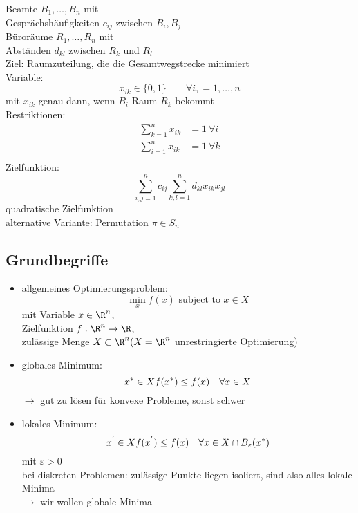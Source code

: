\begin{beispiel}\enter
	Beamte $B_{1},\dots,B_{n}$ mit \\
	Gesprächshäufigkeiten $c_{ij}$ zwischen $B_{i},B_{j}$ \\
	Büroräume $R_{1}, \dots, R_{n}$ mit \\
	Abständen $d_{kl}$ zwischen $R_{k}$ und $R_{l}$ \\
	Ziel: Raumzuteilung, die die Gesamtwegstrecke minimiert\\
	Variable:
	\begin{equation*}
		x_{ik} \in \{0,1\}\qquad \forall i,=1,\dots,n
	\end{equation*}
	mit $x_{ik}$ genau dann, wenn $B_{i}$ Raum $R_{k}$ bekommt\\
	Restriktionen:
	\begin{align*}
		\sum_{k=1}^{n} x_{ik} &=1 \ \forall i\\
		\sum_{i=1}^{n} x_{ik} &=1 \ \forall k\\
	\end{align*}
	Zielfunktion:
	\begin{equation*}
		\sum_{i,j=1}^{n} c_{ij}\sum_{k,l=1}^{n} d_{kl}x_{ik}x_{jl}
	\end{equation*}
	quadratische Zielfunktion \\
	alternative Variante: Permutation $\pi \in S_{n}$
\end{beispiel}

\subsection{Grundbegriffe}
\begin{itemize}
	\item allgemeines Optimierungsproblem:
		\begin{equation*}
			\min_{x} f(x) \text{ subject to } x\in X
		\end{equation*}
		mit Variable $x \in \R^n$,\\
		Zielfunktion $f:\R^n \to \R$,\\
		zulässige Menge $X \subset \R^n (X = \R^n$ unrestringierte Optimierung)
	\item globales Minimum:
		\begin{equation*}
			x^* \in X \mit f(x^*)\leq f(x)\quad \forall x \in X
		\end{equation*}
		$\to$ gut zu lösen für konvexe Probleme, sonst schwer
	\item lokales Minimum:
		\begin{equation*}
			x^{'} \in X \mit f(x^{'}) \leq f(x)\quad \forall x \in X \cap B_{\varepsilon}(x^*)
		\end{equation*}
		mit $\varepsilon > 0$\\
		bei diskreten Problemen: zulässige Punkte liegen isoliert, sind also alles lokale Minima\\
		$\to$  wir wollen globale Minima
\end{itemize}
